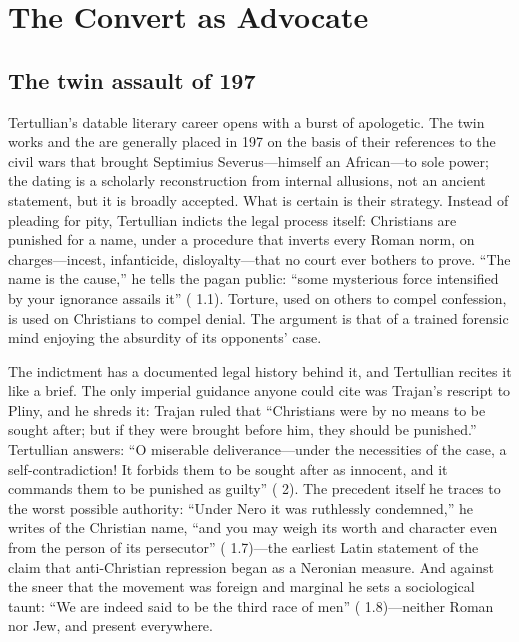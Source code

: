 \section{The Convert as Advocate}

\subsection{The twin assault of 197}

Tertullian's datable literary career opens with a burst of apologetic. The twin
works  and the  are generally placed in 197
on the basis of their references to the civil wars that brought Septimius
Severus---himself an African---to sole power; the dating is a scholarly
reconstruction from internal allusions, not an ancient statement, but it is
broadly accepted. What is certain is their strategy. Instead of pleading for
pity, Tertullian indicts the legal process itself: Christians are punished for
a name, under a procedure that inverts every Roman norm, on charges---incest,
infanticide, disloyalty---that no court ever bothers to prove. ``The name is
the cause,'' he tells the pagan public: ``some mysterious force intensified by
your ignorance assails it'' ( 1.1). Torture, used on
others to compel confession, is used on Christians to compel denial. The
argument is that of a trained forensic mind enjoying the absurdity of its
opponents' case.

The indictment has a documented legal history behind it, and Tertullian
recites it like a brief. The only imperial guidance anyone could cite was
Trajan's rescript to Pliny, and he shreds it: Trajan ruled that ``Christians
were by no means to be sought after; but if they were brought before him, they
should be punished.'' Tertullian answers: ``O miserable
deliverance---under the necessities of the case, a self-contradiction! It
forbids them to be sought after as innocent, and it commands them to be
punished as guilty'' ( 2). The precedent itself he traces to the worst
possible authority: ``Under Nero it was ruthlessly condemned,'' he writes of
the Christian name, ``and you may weigh its worth and character even from the
person of its persecutor'' ( 1.7)---the earliest Latin
statement of the claim that anti-Christian repression began as a Neronian
measure. And against the sneer that the movement was foreign and marginal he
sets a sociological taunt: ``We are indeed said to be the third race of men''
( 1.8)---neither Roman nor Jew, and present everywhere.

